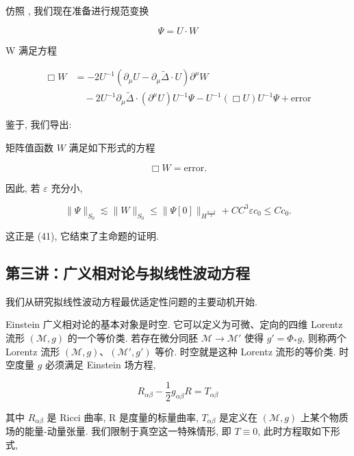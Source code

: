 仿照 \cite{gfref70}, 我们现在准备进行规范变换

\begin{equation}
\Psi = U \cdot W\label{eq:cG-62}
\end{equation}

W 满足方程

\begin{equation}
\begin{aligned}
\Box W &= - 2 U ^ {- 1} (\partial_ {\mu} U - \partial_ {\mu} \tilde {\Delta} \cdot U) \partial^ {\mu} W \\
&\quad - 2 U ^ {- 1} \partial_ {\mu} \tilde {\Delta} \cdot (\partial^ {\mu} U) U ^ {- 1} \Psi - U ^ {- 1} (\Box U) U ^ {- 1} \Psi + \mathrm{error}
\end{aligned}\label{eq:cG-63}
\end{equation}

鉴于, 我们导出:

\begin{proposition}\label{prop:cG-2.29}
矩阵值函数 $W$ 满足如下形式的方程

\[
\Box W = \mathrm{error}.
\]

因此, 若 $\varepsilon$ 充分小, 

\[
\| \Psi \| _ {S _ {0}} \lesssim \| W \| _ {S _ {0}} \leq \| \Psi [ 0 ] \| _ {H ^ {\frac {n - 2}{2}}} + C C ^ {3} \varepsilon c _ {0} \leq C c _ {0}.
\]

这正是 (41), 它结束了主命题的证明. 
\end{proposition}

\subsection{第三讲：广义相对论与拟线性波动方程}

我们从研究拟线性波动方程最优适定性问题的主要动机开始. 


Einstein 广义相对论的基本对象是时空. 它可以定义为可微、定向的四维 Lorentz 流形 $(\mathcal{M},  g)$ 的一个等价类. 若存在微分同胚 $\mathcal{M} \to \mathcal{M}'$ 使得 $g' = \Phi_* g$, 则称两个 Lorentz 流形 $(\mathcal{M},  g)$、$(\mathcal{M}',  g')$ 等价. 时空就是这种 Lorentz 流形的等价类. 时空度量 $g$ 必须满足 Einstein 场方程, 

\[
R _ {\alpha \beta} - \frac {1}{2} g _ {\alpha \beta} R = T _ {\alpha \beta}
\]

其中 $R_{\alpha\beta}$ 是 Ricci 曲率, R 是度量的标量曲率, $T_{\alpha\beta}$ 是定义在 $(\mathcal{M},  g)$ 上某个物质场的能量-动量张量. 我们限制于真空这一特殊情形, 即 $T \equiv 0$, 此时方程取如下形式, 

